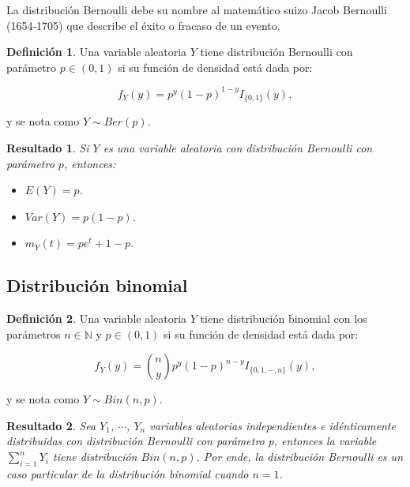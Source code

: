 \documentclass[
  10pt,
  spanish,
]{book}
\providecommand{\tightlist}{%
  \setlength{\itemsep}{0pt}\setlength{\parskip}{0pt}}
\newtheorem{proposition}{Resultado}[chapter]
\theoremstyle{definition}
\newtheorem{definition}{Definición}[chapter]
\theoremstyle{definition}
\theoremstyle{definition}
\theoremstyle{definition}
\theoremstyle{remark}
\begin{document}
La distribución Bernoulli debe su nombre al matemático suizo Jacob Bernoulli (1654-1705) que describe el éxito o fracaso de un evento.

\begin{definition}
\protect\hypertarget{def:unnamed-chunk-5}{}{\label{def:unnamed-chunk-5} }Una variable aleatoria \(Y\) tiene distribución Bernoulli con parámetro \(p\in (0,1)\) si su función de densidad está dada por:

\begin{equation}
f_Y(y)=p^y(1-p)^{1-y}I_{\{0,1\}}(y),
\end{equation}

y se nota como \(Y\sim Ber(p)\).
\end{definition}

\begin{proposition}
\protect\hypertarget{prp:unnamed-chunk-6}{}{\label{prp:unnamed-chunk-6} }Si \(Y\) es una variable aleatoria con distribución Bernoulli con parámetro \(p\), entonces:

\begin{itemize}
\tightlist
\item
  \(E(Y)=p\).
\item
  \(Var(Y)=p(1-p)\).
\item
  \(m_Y(t)=pe^t+1-p\).
\end{itemize}
\end{proposition}

\hypertarget{distribuciuxf3n-binomial}{%
\subsection{Distribución binomial}\label{distribuciuxf3n-binomial}}

\begin{definition}
\protect\hypertarget{def:unnamed-chunk-7}{}{\label{def:unnamed-chunk-7} }Una variable aleatoria \(Y\) tiene distribución binomial con los parámetros \(n\in \mathbb{N}\) y \(p\in (0,1)\) si su función de densidad está dada por:

\begin{equation}
f_Y(y)=\binom{n}{y}p^y(1-p)^{n-y}I_{\{0,1,\cdots,n\}}(y),
\end{equation}

y se nota como \(Y\sim Bin(n,p)\).
\end{definition}

\begin{proposition}
\protect\hypertarget{prp:unnamed-chunk-8}{}{\label{prp:unnamed-chunk-8} }Sea \(Y_1\), \(\cdots\), \(Y_n\) variables aleatorias independientes e idénticamente distribuidas con distribución Bernoulli con parámetro \(p\),
entonces la variable \(\sum_{i=1}^nY_i\) tiene distribución \(Bin(n,p)\). Por ende, la distribución Bernoulli es un caso particular de la distribución binomial cuando \(n=1\).
\end{proposition}
\end{document}
